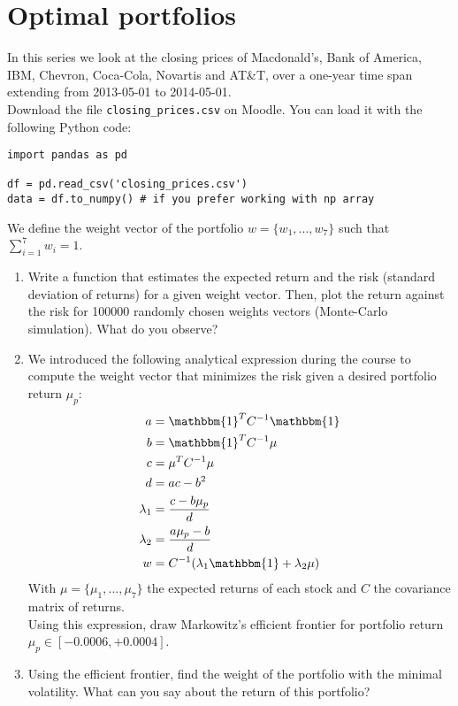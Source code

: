 \section*{Optimal portfolios}

In this series we look at the closing prices of Macdonald's, Bank of America, IBM, Chevron, Coca-Cola, Novartis and AT\&T, over a one-year time span extending from 2013-05-01 to 2014-05-01. \\

\noindent Download the file \texttt{closing\_prices.csv} on Moodle. You can load it with the following Python code:

\begin{verbatim}
import pandas as pd

df = pd.read_csv('closing_prices.csv')
data = df.to_numpy() # if you prefer working with np array
\end{verbatim}

\noindent We define the weight vector of the portfolio $w = \{w_1, ..., w_7\}$ such that $\sum\limits_{i=1}^{7} w_i = 1$.

\begin{enumerate}
    \item Write a function that estimates the expected return and the risk (standard deviation of returns) for a given weight vector. Then, plot the return against the risk for 100000 randomly chosen weights vectors (Monte-Carlo simulation). What do you observe?
    \item We introduced the following analytical expression during the course to compute the weight vector that minimizes the risk given a desired portfolio return $\mu_p$:
        \begin{equation}
        \begin{aligned}
            a &= \mathbbm{1}^T C^{-1} \mathbbm{1} \\
            b &= \mathbbm{1}^T C^{-1} \mu  \\
            c &= \mu^T C^{-1} \mu  \\
            d &= ac - b^2 \\
            \lambda_1 &= \frac{c - b \mu_p}{d} \\
            \lambda_2 &= \frac{a \mu_p - b}{d} \\
            w &= C^{-1} (\lambda_1 \mathbbm{1} + \lambda_2 \mu)  \\
        \end{aligned}
        \end{equation}
    With $\mu = \{\mu_1, ..., \mu_7\}$ the expected returns of each stock and $C$ the covariance matrix of returns.\\ 
    
        \noindent Using this expression, draw Markowitz's efficient frontier for portfolio return $\mu_p \in [-0.0006, +0.0004]$.


    \item Using the efficient frontier, find the weight of the portfolio with the minimal volatility. What can you say about the return of this portfolio?
\end{enumerate}



